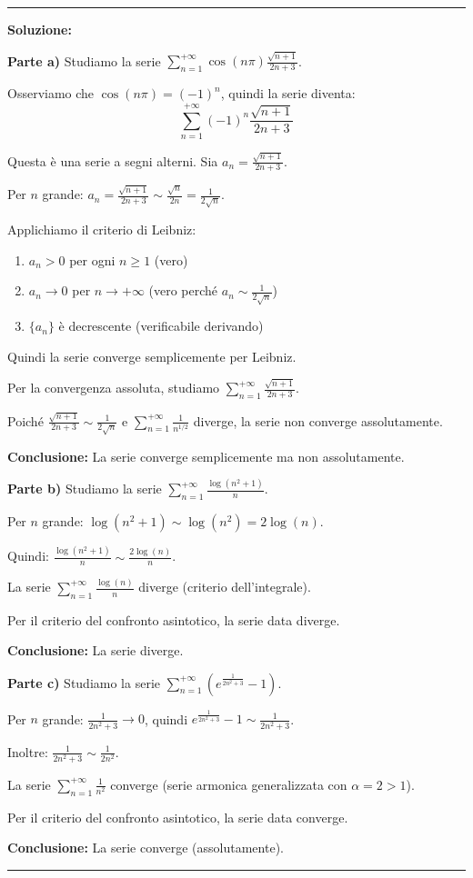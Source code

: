 \documentclass[12pt, a4paper]{article}
\newenvironment{solution}
{\par\noindent\rule{\textwidth}{0.4pt}\par\textbf{Soluzione:}\medskip\par}
{\par\rule{\textwidth}{0.4pt}\par\bigskip}
\begin{document}
\begin{solution}
\textbf{Parte a)} Studiamo la serie $\displaystyle\sum_{n=1}^{+\infty} \cos(n\pi) \frac{\sqrt{n+1}}{2n+3}$.

Osserviamo che $\cos(n\pi) = (-1)^n$, quindi la serie diventa:
\[
\sum_{n=1}^{+\infty} (-1)^n \frac{\sqrt{n+1}}{2n+3}
\]

Questa è una serie a segni alterni. Sia $a_n = \frac{\sqrt{n+1}}{2n+3}$.

Per $n$ grande: $a_n = \frac{\sqrt{n+1}}{2n+3} \sim \frac{\sqrt{n}}{2n} = \frac{1}{2\sqrt{n}}$.

Applichiamo il criterio di Leibniz:
\begin{enumerate}
    \item $a_n > 0$ per ogni $n \geq 1$ (vero)
    \item $a_n \to 0$ per $n \to +\infty$ (vero perché $a_n \sim \frac{1}{2\sqrt{n}}$)
    \item $\{a_n\}$ è decrescente (verificabile derivando)
\end{enumerate}

Quindi la serie converge semplicemente per Leibniz.

Per la convergenza assoluta, studiamo $\displaystyle\sum_{n=1}^{+\infty} \frac{\sqrt{n+1}}{2n+3}$.

Poiché $\frac{\sqrt{n+1}}{2n+3} \sim \frac{1}{2\sqrt{n}}$ e $\displaystyle\sum_{n=1}^{+\infty} \frac{1}{n^{1/2}}$ diverge, la serie non converge assolutamente.

\textbf{Conclusione:} La serie converge semplicemente ma non assolutamente.

\vspace{0.5cm}

\textbf{Parte b)} Studiamo la serie $\displaystyle\sum_{n=1}^{+\infty} \frac{\log(n^{2}+1)}{n}$.

Per $n$ grande: $\log(n^2 + 1) \sim \log(n^2) = 2\log(n)$.

Quindi: $\frac{\log(n^{2}+1)}{n} \sim \frac{2\log(n)}{n}$.

La serie $\displaystyle\sum_{n=1}^{+\infty} \frac{\log(n)}{n}$ diverge (criterio dell'integrale).

Per il criterio del confronto asintotico, la serie data diverge.

\textbf{Conclusione:} La serie diverge.

\vspace{0.5cm}

\textbf{Parte c)} Studiamo la serie $\displaystyle\sum_{n=1}^{+\infty} \left(e^{\frac{1}{2n^{2}+3}} - 1\right)$.

Per $n$ grande: $\frac{1}{2n^2 + 3} \to 0$, quindi $e^{\frac{1}{2n^{2}+3}} - 1 \sim \frac{1}{2n^2 + 3}$.

Inoltre: $\frac{1}{2n^2 + 3} \sim \frac{1}{2n^2}$.

La serie $\displaystyle\sum_{n=1}^{+\infty} \frac{1}{n^2}$ converge (serie armonica generalizzata con $\alpha = 2 > 1$).

Per il criterio del confronto asintotico, la serie data converge.

\textbf{Conclusione:} La serie converge (assolutamente).
\end{solution}
\end{document}
